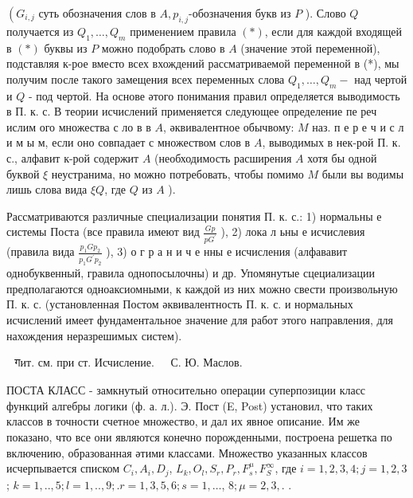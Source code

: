 \documentclass[10pt]{article}
\begin{document}
$\left(G_{i, j}\right.$ суть обозначения слов в $A, p_{i, j}$-обозначения букв из $P$ ). Слово $Q$ получается из $Q_{1}, \ldots, Q_{m}$ применением правила $(*)$, если для каждой входящей в $(*)$ буквы из $P$ можно подобрать слово в $A$ (значение этой переменной), подставляя к-рое вместо всех вхождений рассматриваемой переменной в (*), мы получим после такого замещения всех переменных слова $Q_{1}, \ldots, Q_{m}-$ над чертой и $Q$ - под чертой. На основе әтого понимания правил определяется выводимость в П. к. с. В теории исчислений применяется следующее определение пе реч ислим ого множества с ло в в $A$, әквивалентное обычвому: $M$ наз. п е р е ч и с л и м ы м, если оно совпадает с множеством слов в $A$, выводимых в нек-рой П. к. с., алфавит к-рой содержит $A$ (необходимость расширения $A$ хотя бы одной буквой $\xi$ неустранима, но можно потребовать, чтобы помимо $M$ были вы водимы лишь слова вида $\xi Q$, где $Q$ из $A$ ).



Рассматриваются различные специализации понятия П. к. с.: 1) нормальны е системы Поста (все правила имеют вид $\frac{G p}{p G^{\prime}}$ ), 2) лока л ьны е исчислевия (правила вида $\frac{p_{1} G p_{2}}{p_{1} G^{\prime} p_{2}}$ ), 3) о г р а н и ч е нны е исчисления (алфававит однобуквенный, гравила однопосылочны) и др. Упомянутые сцециализации предполагаются одноаксиомными, к каждой из них можно свести произвольную П. к. с. (установленная Постом әквивалентность П. к. с. и нормальных исчислений имеет фундаментальное значение для работ этого направления, для нахождения неразрешимых систем).



$\begin{array}{ll}\text { गит. см. при ст. Исчисление. } & \text { С. Ю. Маслов. }\end{array}$



ПОСТА КЛАСС - замкнутый относительно операции суперпозиции класс функций алгебры логики (ф. а. л.). Э. Пост (E, Post) установил, что таких классов в точности счетное множество, и дал их явное описание. Им же показано, что все они являются конечно порожденными, построена решетка по включению, образованная әтими классами. Множество указанных классов исчерпывается списком $C_{i}, A_{i}, D_{j}$, $L_{k}, O_{l}, S_{r}, P_{r}, F_{s}^{\mu}, F_{S}^{\infty}$, где $i=1,2,3,4 ; j=1,2,3$; $k=1, . ., 5 ; l=1, . ., 9 ; . r=1,3,5,6 ; s=1, \ldots$, $8 ; \mu=2,3,$. .
\end{document}
